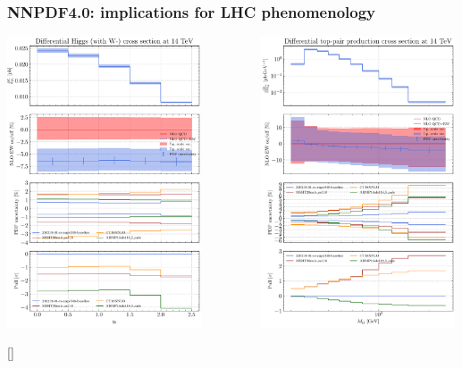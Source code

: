 \documentclass{beamer}
\begin{document}
\begin{frame}
 \frametitle{NNPDF4.0: implications for LHC phenomenology}
 \footnotesize
 \centering
 \vspace{0.2cm}
 \includegraphics[width=0.43\textwidth]{plots/NNPDF40_HIGGS_WM-global}
 \ \ \ \ \ \ \ \ \ 
 \includegraphics[width=0.43\textwidth]{plots/NNPDF40_TTBAR-global}\\
 \begin{flushright}
  \tiny{[{\color{salmon}{Plots by courtesy of C.~Schwan}}]}
 \end{flushright}
\end{frame}
\end{document}
